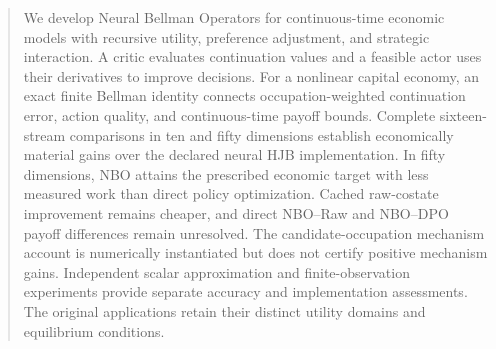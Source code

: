 \begin{abstract}
We develop Neural Bellman Operators for continuous-time economic models with recursive utility, preference adjustment, and strategic interaction. A critic evaluates continuation values and a feasible actor uses their derivatives to improve decisions. For a nonlinear capital economy, an exact finite Bellman identity connects occupation-weighted continuation error, action quality, and continuous-time payoff bounds. Complete sixteen-stream comparisons in ten and fifty dimensions establish economically material gains over the declared neural HJB implementation. In fifty dimensions, NBO attains the prescribed economic target with less measured work than direct policy optimization. Cached raw-costate improvement remains cheaper, and direct NBO--Raw and NBO--DPO payoff differences remain unresolved. The candidate-occupation mechanism account is numerically instantiated but does not certify positive mechanism gains. Independent scalar approximation and finite-observation experiments provide separate accuracy and implementation assessments. The original applications retain their distinct utility domains and equilibrium conditions.
\end{abstract}
